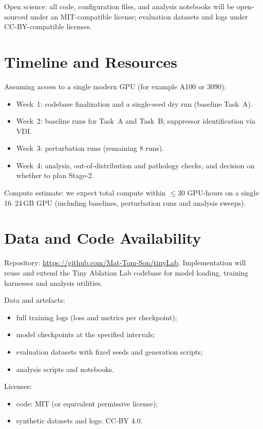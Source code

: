 \documentclass[11pt]{article}
\begin{document}
Open science: all code, configuration files, and analysis notebooks will be open-sourced under an MIT-compatible license; evaluation datasets and logs under CC-BY-compatible licenses.

\section{Timeline and Resources}

Assuming access to a single modern GPU (for example A100 or 3090):
\begin{itemize}
  \item Week~1: codebase finalization and a single-seed dry run (baseline Task~A).
  \item Week~2: baseline runs for Task~A and Task~B; suppressor identification via VDI.
  \item Week~3: perturbation runs (remaining 8 runs).
  \item Week~4: analysis, out-of-distribution and pathology checks, and decision on whether to plan Stage-2.
\end{itemize}

Compute estimate: we expect total compute within $\le 30$ GPU-hours on a single 16--24\,GB GPU (including baselines, perturbation runs and analysis sweeps).

\section{Data and Code Availability}

Repository: \url{https://github.com/Mat-Tom-Son/tinyLab}. Implementation will reuse and extend the Tiny Ablation Lab codebase for model loading, training harnesses and analysis utilities.

Data and artefacts:
\begin{itemize}
  \item full training logs (loss and metrics per checkpoint);
  \item model checkpoints at the specified intervals;
  \item evaluation datasets with fixed seeds and generation scripts;
  \item analysis scripts and notebooks.
\end{itemize}

Licenses:
\begin{itemize}
  \item code: MIT (or equivalent permissive license);
  \item synthetic datasets and logs: CC-BY 4.0.
\end{itemize}
\end{document}
